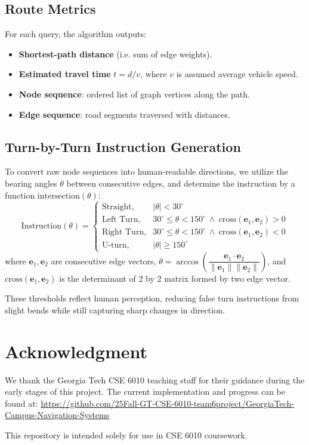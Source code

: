 \documentclass[fleqn,10pt]{olplainarticle}
\begin{document}
\subsection*{Route Metrics}
For each query, the algorithm outputs:
\begin{itemize}
    \item \textbf{Shortest-path distance} (i.e. sum of edge weights).
    \item \textbf{Estimated travel time} $t = d/v$, where $v$ is assumed average vehicle speed.
    \item \textbf{Node sequence}: ordered list of graph vertices along the path.
    \item \textbf{Edge sequence}: road segments traversed with distances.
\end{itemize}

\subsection*{Turn-by-Turn Instruction Generation}

To convert raw node sequences into human-readable directions, we utilize the bearing angles $\theta$ between consecutive edges, and determine the instruction by a function $\text{intersection}(\theta)$:
\[
\text{Instruction}(\theta) =
\begin{cases}
\text{Straight}, & |\theta| < 30^\circ \\[6pt]
\text{Left Turn}, & 30^\circ \leq \theta < 150^\circ \ \wedge \ \text{cross}(\mathbf{e}_1,\mathbf{e}_2) > 0 \\[6pt]
\text{Right Turn}, & 30^\circ \leq \theta < 150^\circ \ \wedge \ \text{cross}(\mathbf{e}_1,\mathbf{e}_2) < 0 \\[6pt]
\text{U-turn}, & |\theta| \geq 150^\circ
\end{cases}
\]
where $\mathbf{e}_1, \mathbf{e}_2$ are consecutive edge vectors, $\theta = \arccos\!\left( \dfrac{\mathbf{e}_1 \cdot \mathbf{e}_2}{\|\mathbf{e}_1\|\|\mathbf{e}_2\|} \right)$, and $\text{cross}(\mathbf{e}_1,\mathbf{e}_2)$ is the determinant of 2 by 2 matrix formed by two edge vector. 

These thresholds reflect human perception, reducing false turn instructions from slight bends while still capturing sharp changes in direction.

\section*{Acknowledgment}
We thank the Georgia Tech CSE 6010 teaching staff for their guidance during the early stages of this project.  
The current implementation and progress can be found at:  
\url{https://github.com/25Fall-GT-CSE-6010-team6project/GeorgiaTech-Campus-Navigation-Systems}

This repository is intended solely for use in CSE 6010 coursework.
\end{document}
